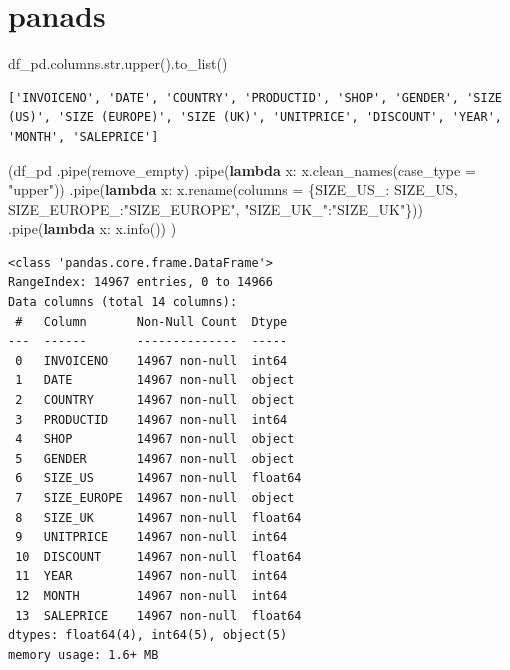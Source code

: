 \documentclass[
  letterpaper,
  DIV=11,
  numbers=noendperiod]{scrreprt}
\newenvironment{Shaded}{\begin{snugshade}}{\end{snugshade}}
\newcommand{\BuiltInTok}[1]{\textcolor[rgb]{0.00,0.23,0.31}{#1}}
\newcommand{\KeywordTok}[1]{\textcolor[rgb]{0.00,0.23,0.31}{\textbf{#1}}}
\newcommand{\NormalTok}[1]{\textcolor[rgb]{0.00,0.23,0.31}{#1}}
\newcommand{\OperatorTok}[1]{\textcolor[rgb]{0.37,0.37,0.37}{#1}}
\newcommand{\StringTok}[1]{\textcolor[rgb]{0.13,0.47,0.30}{#1}}
\begin{document}
\section{panads}

\begin{Shaded}
\begin{Highlighting}[]
\NormalTok{df\_pd.columns.}\BuiltInTok{str}\NormalTok{.upper().to\_list()}
\end{Highlighting}
\end{Shaded}

\begin{verbatim}
['INVOICENO', 'DATE', 'COUNTRY', 'PRODUCTID', 'SHOP', 'GENDER', 'SIZE (US)', 'SIZE (EUROPE)', 'SIZE (UK)', 'UNITPRICE', 'DISCOUNT', 'YEAR', 'MONTH', 'SALEPRICE']
\end{verbatim}

\begin{Shaded}
\begin{Highlighting}[]
\NormalTok{(df\_pd}
\NormalTok{     .pipe(remove\_empty)}
\NormalTok{     .pipe(}\KeywordTok{lambda}\NormalTok{ x: x.clean\_names(case\_type }\OperatorTok{=} \StringTok{"upper"}\NormalTok{))}
\NormalTok{     .pipe(}\KeywordTok{lambda}\NormalTok{ x: x.rename(columns }\OperatorTok{=}\NormalTok{ \{}\StringTok{\textquotesingle{}SIZE\_US\_\textquotesingle{}}\NormalTok{: }\StringTok{\textquotesingle{}SIZE\_US\textquotesingle{}}\NormalTok{, }\StringTok{\textquotesingle{}SIZE\_EUROPE\_\textquotesingle{}}\NormalTok{:}\StringTok{"SIZE\_EUROPE"}\NormalTok{, }\StringTok{"SIZE\_UK\_"}\NormalTok{:}\StringTok{"SIZE\_UK"}\NormalTok{\}))}
\NormalTok{     .pipe(}\KeywordTok{lambda}\NormalTok{ x: x.info())}
\NormalTok{     )}
\end{Highlighting}
\end{Shaded}

\begin{verbatim}
<class 'pandas.core.frame.DataFrame'>
RangeIndex: 14967 entries, 0 to 14966
Data columns (total 14 columns):
 #   Column       Non-Null Count  Dtype  
---  ------       --------------  -----  
 0   INVOICENO    14967 non-null  int64  
 1   DATE         14967 non-null  object 
 2   COUNTRY      14967 non-null  object 
 3   PRODUCTID    14967 non-null  int64  
 4   SHOP         14967 non-null  object 
 5   GENDER       14967 non-null  object 
 6   SIZE_US      14967 non-null  float64
 7   SIZE_EUROPE  14967 non-null  object 
 8   SIZE_UK      14967 non-null  float64
 9   UNITPRICE    14967 non-null  int64  
 10  DISCOUNT     14967 non-null  float64
 11  YEAR         14967 non-null  int64  
 12  MONTH        14967 non-null  int64  
 13  SALEPRICE    14967 non-null  float64
dtypes: float64(4), int64(5), object(5)
memory usage: 1.6+ MB
\end{verbatim}
\end{document}
